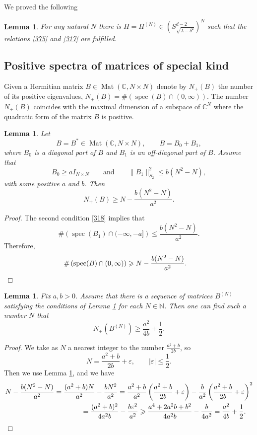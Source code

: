 \documentclass[a4paper,12pt]{article}
\numberwithin{equation}{section}
\def \de{\delta}
\def \er{\varepsilon}
\def \la{\lambda}
\def \C{\mathbb{C}}
\def \N{\mathbb{N}}
\def\mat{\operatorname{Mat}}
\def\spec{\operatorname{spec}}
\newcommand{\<}{\langle}
\renewcommand{\>}{\rangle}
\theoremstyle{plain}
\newtheorem{lemma}[theorem]{\bf Lemma}
\theoremstyle{definition}
\theoremstyle{remark}
\renewcommand{\le}{\leqslant}
\renewcommand{\ge}{\geqslant}
\begin{document}
We proved the following

\begin{lemma}
\label{l317}
For any natural $N$ there is $H = H^{(N)} \in \left(S_{\sqrt{\la-\de^2}}^{d-2}\right)^N$
such that the relations
\eqref{375} and \eqref{317} are fulfilled.
\end{lemma}

\subsection{Positive spectra of matrices of special kind}
Given a Hermitian matrix $B \in \mat (\C, N \times N)$
denote by $N_+ (B)$ the number of its positive eigenvalues,
$N_+(B) = \# \left(\spec (B) \cap (0, \infty)\right)$.
The number $N_+ (B)$ coincides with the maximal dimension
of a subspace of $\C^N$ where the quadratic form of the matrix $B$ is positive.

\begin{lemma}
\label{l318}
Let 
$$
B = B^* \in \mat (\C, N \times N), \qquad B = B_0 + B_1,
$$
where $B_0$ is a diagonal part of $B$ and $B_1$ is an off-diagonal part of $B$.
Assume that
\begin{equation}
\label{318}
B_0 \ge a I_{N \times N} \qquad \text{and} \qquad
\|B_1\|_{S_2}^2 \le b (N^2-N),
\end{equation}
with some positive $a$ and $b$.
Then
$$
N_+ (B) \ge N - \frac{b(N^2-N)}{a^2}.
$$
\end{lemma}

\begin{proof}
The second condition \eqref{318} implies that
$$
\# \left(\spec (B_1) \cap (-\infty, -a]\right) \le \frac{b(N^2-N)}{a^2}.
$$
Therefore,
$$
\# \left(\spec (B) \cap (0, \infty)\right)
\ge N - \frac{b(N^2-N)}{a^2}.
\quad \qedhere
$$
\end{proof}

\begin{lemma}
\label{l319}
Fix $a, b > 0$. 
Assume that there is a sequence of matrices $B^{(N)}$ 
satisfying the conditions of Lemma \ref{l318} for each $N \in \N$.
Then one can find such a number $N$ that
$$
N_+ (B^{(N)}) \ge \frac{a^2}{4b} + \frac12.
$$
\end{lemma}

\begin{proof}
We take as $N$ a nearest integer to the number $\frac{a^2 + b}{2b}$,
so
$$
N = \frac{a^2 + b}{2b} + \er, \qquad |\er| \le \frac12.
$$
Then we use Lemma \ref{l318}, and we have
\begin{eqnarray*}
N - \frac{b(N^2-N)}{a^2} = \frac{(a^2+b)N}{a^2} - \frac{bN^2}{a^2}
= \frac{a^2+b}{a^2} \left(\frac{a^2 + b}{2b} + \er\right) 
- \frac{b}{a^2} \left(\frac{a^2 + b}{2b} + \er\right)^2 \\
= \frac{(a^2+b)^2}{4a^2b} - \frac{b\er^2}{a^2}
\ge \frac{a^4 + 2a^2b + b^2}{4a^2b} - \frac{b}{4a^2} 
= \frac{a^2}{4b} + \frac12. \quad \qedhere
\end{eqnarray*}
\end{proof}
\end{document}
